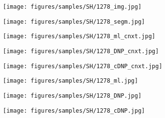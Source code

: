 \documentclass[10pt,twocolumn,letterpaper]{article}
\begin{document}
\begin{figure*}[h!]
    \begin{subfigure}[b]{0.11\textwidth}
        \centering
        \texttt{[image: figures/samples/SH/1278\_img.jpg]}
    \end{subfigure}
    \begin{subfigure}[b]{0.11\textwidth}
        \centering
        \texttt{[image: figures/samples/SH/1278\_segm.jpg]}
    \end{subfigure}
    \hspace{3px}
    \begin{subfigure}[b]{0.11\textwidth}
        \centering
        \texttt{[image: figures/samples/SH/1278\_ml\_cnxt.jpg]}
    \end{subfigure}
    \begin{subfigure}[b]{0.11\textwidth}
        \centering
        \texttt{[image: figures/samples/SH/1278\_DNP\_cnxt.jpg]}
    \end{subfigure}
    \begin{subfigure}[b]{0.11\textwidth}
        \centering
        \texttt{[image: figures/samples/SH/1278\_cDNP\_cnxt.jpg]}
    \end{subfigure}
    \hspace{3px}
    \begin{subfigure}[b]{0.11\textwidth}
        \centering
        \texttt{[image: figures/samples/SH/1278\_ml.jpg]}
    \end{subfigure}
    \begin{subfigure}[b]{0.11\textwidth}
        \centering
        \texttt{[image: figures/samples/SH/1278\_DNP.jpg]}
    \end{subfigure}
    \begin{subfigure}[b]{0.11\textwidth}
        \centering
        \texttt{[image: figures/samples/SH/1278\_cDNP.jpg]}
    \end{subfigure}
    

\end{figure*}
\end{document}
